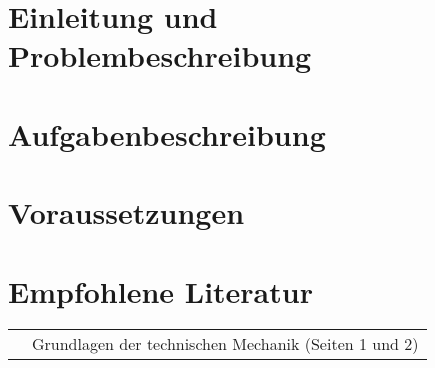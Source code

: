 \documentclass[RAIdocument%
              ,optBiber%
              ]{RAIlatex}%
\begin{document}
%
%
%
%
\section*{Einleitung und Problembeschreibung}%
\blindtext%
%
%
\section*{Aufgabenbeschreibung}%
\blindtext%
%
%
\section*{Voraussetzungen}%
\blindtext%
%
%
\section*{Empfohlene Literatur}%
\begin{tabular}{ll}%
    \cite{Pfeiffer2014} & Grundlagen der technischen Mechanik (Seiten 1 und 2)%
\end{tabular}%
%
{%
    \printbibliography%
}%
%
\end{document}
